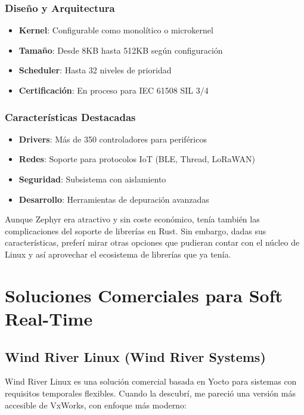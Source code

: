         \subsubsection{Diseño y Arquitectura}
            \begin{itemize}
                \item \textbf{Kernel}: Configurable como monolítico o microkernel
                \item \textbf{Tamaño}: Desde 8KB hasta 512KB según configuración
                \item \textbf{Scheduler}: Hasta 32 niveles de prioridad
                \item \textbf{Certificación}: En proceso para IEC 61508 SIL 3/4
            \end{itemize}

        \subsubsection{Características Destacadas}
            \begin{itemize}
                \item \textbf{Drivers}: Más de 350 controladores para periféricos
                \item \textbf{Redes}: Soporte para protocolos IoT (BLE, Thread, LoRaWAN)
                \item \textbf{Seguridad}: Subsistema con aislamiento
                \item \textbf{Desarrollo}: Herramientas de depuración avanzadas
            \end{itemize}

        Aunque Zephyr era atractivo y sin coste económico, tenía también las complicaciones del soporte de librerías en Rust. Sin embargo, dadas sus características, preferí mirar otras opciones que pudieran contar con el núcleo de Linux y así aprovechar el ecosistema de librerías que ya tenía.

\newpage
\section{Soluciones Comerciales para Soft Real-Time}
    \subsection{Wind River Linux (Wind River Systems)}
        Wind River Linux es una solución comercial basada en Yocto para sistemas con requisitos temporales flexibles. Cuando la descubrí, me pareció una versión más accesible de VxWorks, con enfoque más moderno:

